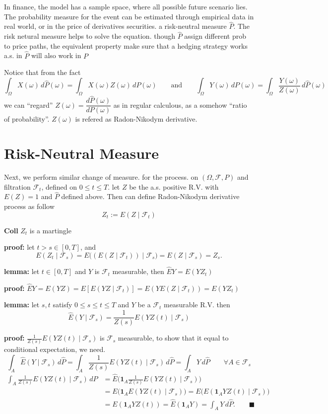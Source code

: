 \documentclass[
  letterpaper,
  DIV=11,
  numbers=noendperiod]{scrreprt}
\theoremstyle{definition}
\theoremstyle{plain}
\theoremstyle{plain}
\theoremstyle{definition}
\theoremstyle{plain}
\theoremstyle{plain}
\theoremstyle{remark}
\begin{document}
In finance, the model has a sample space, where all possible future
scenario lies. The probability measure for the event can be estimated
through empirical data in real world, or in the price of derivatives
securities. a risk-neutral measure \(\hat{P}\). The risk netural measure
helps to solve the equation. though \(\hat{P}\) assign different prob to
price paths, the equivalent property make sure that a hedging strategy
works a.s. in \(\hat{P}\) will also work in \(P\)

Notice that from the fact \[
\int_\Omega X(\omega) \, d\hat{P}(\omega) = \int_\Omega X(\omega) Z(\omega) \, dP(\omega) \qquad \text{and} \qquad \int_\Omega Y(\omega) \, dP(\omega) = \int_\Omega \frac{Y(\omega)}{Z(\omega)} \, d\hat{P}(\omega)
\] we can ``regard''
\(Z(\omega) = \dfrac{d\hat{P}(\omega)}{dP(\omega)}\) as in regular
calculous, as a somehow ``ratio of probability''. \(Z(\omega)\) is
refered as Radon-Nikodym derivative.

\section{Risk-Neutral Measure}\label{risk-neutral-measure}

Next, we perform similar change of measure. for the process. on
\((\Omega, \mathcal{F}, P)\) and filtration \(\mathcal{F}_t\), defined
on \(0 \leq t \leq T\). let \(Z\) be the a.s. positive R.V. with
\(E(Z) = 1\) and \(\hat{P}\) defined above. Then can define
Radon-Nikodym derivative process as follow \[
Z_t := E(Z \mid \mathcal{F}_t)
\]

\textbf{Coll} \(Z_t\) is a martingle

\textbf{proof:} let \(t > s \in [0,T]\), and \[
E(Z_t \mid \mathcal{F}_s) = E\big((E(Z \mid \mathcal{F}_t)) \mid \mathcal{F}_s\big) = E(Z \mid \mathcal{F}_s) = Z_s.
\]

\textbf{lemma:} let \(t \in [0,T]\) and \(Y\) is \(\mathcal{F}_t\)
measurable, then \(\hat{E} Y = E(Y Z_t)\)

\textbf{proof:}
\(\hat{E} Y = E(YZ) = E[E(YZ \mid \mathcal{F}_t)] = E(Y E(Z \mid \mathcal{F}_t)) = E(Y Z_t)\)

\textbf{lemma:} let \(s, t\) satisfy \(0 \leq s \leq t \leq T\) and
\(Y\) be a \(\mathcal{F}_t\) measurable R.V. then \[
\hat{E}(Y \mid \mathcal{F}_s) = \frac{1}{Z(s)} E(Y Z(t) \mid \mathcal{F}_s)
\]

\textbf{proof:} \(\frac{1}{Z(s)} E(Y Z(t) \mid \mathcal{F}_s)\) is
\(\mathcal{F}_s\) measurable, to show that it equal to conditional
expectation, we need. \[
\int_A \hat{E}(Y \mid \mathcal{F}_s) \, d\hat{P} = \int_A \frac{1}{Z(s)} E(Y Z(t) \mid \mathcal{F}_s) \, d\hat{P} = \int_A Y \, d\hat{P} \qquad \forall A \in \mathcal{F}_s
\] \[
\begin{aligned}
\int_A \frac{1}{Z(s)} E(Y Z(t) \mid \mathcal{F}_s) \, d\hat{P} &= \hat{E}\Big(\mathbf{1}_A \frac{1}{Z(s)} E(Y Z(t) \mid \mathcal{F}_s)\Big) \\
&= E\big(\mathbf{1}_A E(Y Z(t) \mid \mathcal{F}_s)\big) = E\big(E(\mathbf{1}_A Y Z(t) \mid \mathcal{F}_s)\big) \\
&= E(\mathbf{1}_A Y Z(t)) = \hat{E}(\mathbf{1}_A Y) = \int_A Y \, d\hat{P}. \qquad \blacksquare
\end{aligned}
\]
\end{document}
